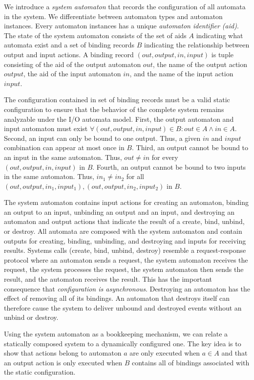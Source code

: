 We introduce a \emph{system automaton} that records the configuration of all automata in the system.
We differentiate between automaton types and automaton instances.
Every automaton instances has a unique \emph{automaton identifier (aid)}.
The state of the system automaton consists of the set of aids $A$ indicating what automata exist and a set of binding records $B$ indicating the relationship between output and input actions.
A binding record $(out, output, in, input)$ is tuple consisting of the aid of the output automaton $out$, the name of the output action $output$, the aid of the input automaton $in$, and the name of the input action $input$.

The configuration contained in set of binding records must be a valid static configuration to ensure that the behavior of the complete system remains analyzable under the I/O automata model.
First, the output automaton and input automaton must exist $\forall (out, output, in, input) \in B: out \in A \land in \in A$.
Second, an input can only be bound to one output.
Thus, a given $in$ and $input$ combination can appear at most once in $B$.
Third, an output cannot be bound to an input in the same automaton.
Thus, $out \neq in$ for every $(out, output, in, input)$ in $B$.
Fourth, an output cannot be bound to two inputs in the same automaton.
Thus, $in_1 \neq in_2$ for all $(out, output, in_1, input_1), (out, output, in_2, input_2)$ in $B$.

The system automaton contains input actions for creating an automaton, binding an output to an input, unbinding an output and an input, and destroying an automaton and output actions that indicate the result of a create, bind, unbind, or destroy.
All automata are composed with the system automaton and contain outputs for creating, binding, unbinding, and destroying and inputs for receiving results.
Systems calls (create, bind, unbind, destroy) resemble a request-response protocol where an automaton sends a request, the system automaton receives the request, the system processes the request, the system automaton then sends the result, and the automaton receives the result.
This has the important consequence that \emph{configuration is asynchronous}.
Destroying an automaton has the effect of removing all of its bindings.
An automaton that destroys itself can therefore cause the system to deliver unbound and destroyed events without an unbind or destroy.

Using the system automaton as a bookkeeping mechanism, we can relate a statically composed system to a dynamically configured one.
The key idea is to show that actions belong to automaton $a$ are only executed when $a \in A$ and that an output action is only executed when $B$ contains all of bindings associated with the static configuration.






